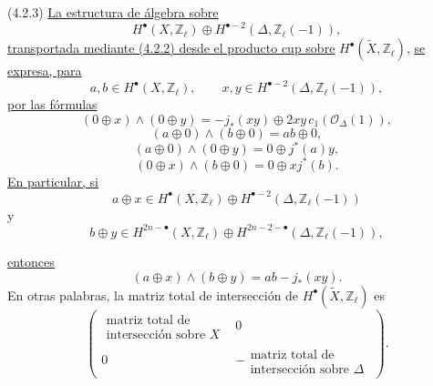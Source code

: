 \smallskip
\noindent
\textup{(4.2.3)} \underline{La estructura de álgebra sobre}
\[
H^\bullet(X,\mathbb Z_\ell)\oplus
H^{\bullet-2}(\Delta,\mathbb Z_\ell(-1)),
\]
\underline{transportada mediante (4.2.2) desde el producto cup sobre}
$H^\bullet(\widetilde X,\mathbb Z_\ell)$,
\underline{se expresa, para}
\[
a,b\in H^\bullet(X,\mathbb Z_\ell),
\qquad
x,y\in H^{\bullet-2}(\Delta,\mathbb Z_\ell(-1)),
\]
\underline{por las fórmulas}
\begin{equation}\tag{4.2.3.1}
(0\oplus x)\wedge(0\oplus y)
=-j_*(xy)\oplus2xy\,c_1(\mathcal O_\Delta(1)),
\end{equation}
\begin{equation}\tag{4.2.3.2}
(a\oplus0)\wedge(b\oplus0)=ab\oplus0,
\end{equation}
\begin{equation}\tag{4.2.3.3}
(a\oplus0)\wedge(0\oplus y)=0\oplus j^*(a)y,
\end{equation}
\begin{equation}\tag{4.2.3.4}
(0\oplus x)\wedge(b\oplus0)=0\oplus xj^*(b).
\end{equation}
\underline{En particular, si}
\[
a\oplus x\in H^\bullet(X,\mathbb Z_\ell)
  \oplus H^{\bullet-2}(\Delta,\mathbb Z_\ell(-1))
\]
y
\[
b\oplus y\in H^{2n-\bullet}(X,\mathbb Z_\ell)
  \oplus H^{2n-2-\bullet}(\Delta,\mathbb Z_\ell(-1)),
\]

\pageoriginale

\underline{entonces}
\begin{equation}\tag{4.2.3.5}
(a\oplus x)\wedge(b\oplus y)=ab-j_*(xy).
\end{equation}
En otras palabras, la matriz total de intersección de
$H^\bullet(\widetilde X,\mathbb Z_\ell)$ es
\[
\left(
\begin{array}{c|c}
\begin{array}{c}
\text{matriz total de}\\[-1pt]
\text{intersección sobre $X$}
\end{array} & 0\\ \hline
0 &
-\begin{array}{c}
\text{matriz total de}\\[-1pt]
\text{intersección sobre $\Delta$}
\end{array}
\end{array}
\right).
\]

